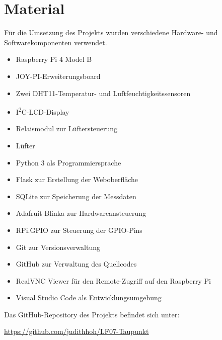 \section{Material}

Für die Umsetzung des Projekts wurden verschiedene
Hardware- und Softwarekomponenten verwendet.

\begin{itemize}
    \item Raspberry Pi 4 Model B
    \item JOY-PI-Erweiterungsboard
    \item Zwei DHT11-Temperatur- und Luftfeuchtigkeitssensoren
    \item I\textsuperscript{2}C-LCD-Display
    \item Relaismodul zur Lüftersteuerung
    \item Lüfter
    \item Python 3 als Programmiersprache
    \item Flask zur Erstellung der Weboberfläche
    \item SQLite zur Speicherung der Messdaten
    \item Adafruit Blinka zur Hardwareansteuerung
    \item RPi.GPIO zur Steuerung der GPIO-Pins
    \item Git zur Versionsverwaltung
    \item GitHub zur Verwaltung des Quellcodes
    \item RealVNC Viewer für den Remote-Zugriff auf den Raspberry Pi
    \item Visual Studio Code als Entwicklungsumgebung
\end{itemize}

Das GitHub-Repository des Projekts befindet sich unter:

\begin{center}
\url{https://github.com/judithhoh/LF07-Taupunkt}
\end{center}